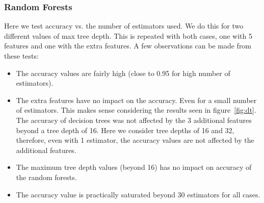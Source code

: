 \documentclass{article}
\begin{document}
\subsubsection{Random Forests}

Here we test accuracy vs. the number of estimators used. We do this for two different values of max tree depth. This is repeated with both cases, one with 5 features and one with the extra features. A few observations can be made from these tests:
\begin{itemize}
\item The accuracy values are fairly high (close to 0.95 for high number of estimators).
\item The extra features have no impact on the accuracy. Even for a small number of estimators. This makes sense considering the results seen in figure~\ref{fig:dt}. The accuracy of decision trees was not affected by the 3 additional features beyond a tree depth of 16. Here we consider tree depths of 16 and 32, therefore, even with 1 estimator, the accuracy values are not affected by the additional features.
\item The maximum tree depth values (beyond 16) has no impact on accuracy of the random forests.
\item The accuracy value is practically saturated beyond 30 estimators for all cases.
\end{itemize}
\end{document}
